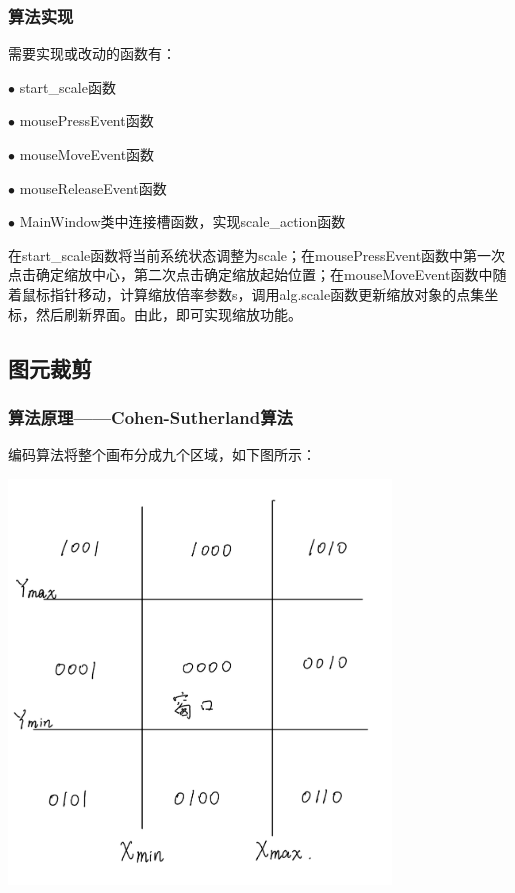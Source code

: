\documentclass[a4paper,UTF8]{article}
\theoremstyle{definition}
\begin{document}
\subsubsection{算法实现}

需要实现或改动的函数有：

$\bullet$ start\_scale函数

$\bullet$ mousePressEvent函数

$\bullet$ mouseMoveEvent函数

$\bullet$ mouseReleaseEvent函数

$\bullet$ MainWindow类中连接槽函数，实现scale\_action函数

在start\_scale函数将当前系统状态调整为scale；在mousePressEvent函数中第一次点击确定缩放中心，第二次点击确定缩放起始位置；在mouseMoveEvent函数中随着鼠标指针移动，计算缩放倍率参数s，调用alg.scale函数更新缩放对象的点集坐标，然后刷新界面。由此，即可实现缩放功能。

\subsection{图元裁剪}

\subsubsection{算法原理——Cohen-Sutherland算法}

编码算法将整个画布分成九个区域，如下图所示：

\begin{center}
	\includegraphics[width=4in]{figs/1.png}
\end{center}
\end{document}
